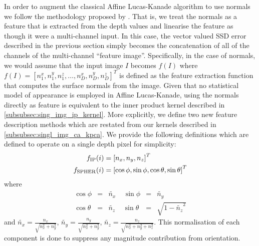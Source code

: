 In order to augment the classical Affine Lucas-Kanade algorithm to use normals
we follow the methodology proposed by \citet{antonakos2015feature}. That is,
we treat the normals as a feature that is extracted from the depth values
and linearise the feature as though it were a multi-channel input. In this case,
the vector valued SSD error described in the previous section simply
becomes the concatenation of all of the channels of the multi-channel
``feature image''. Specifically, in the case of normals, we would assume
that the input image $I$ becomes $f(I)$ where
$f(I) = {[n^x_1, n^y_1, n^z_1, \ldots, n^x_D, n^y_D, n^z_D]}^T$ is defined as
the feature extraction function that computes the surface normals from the
image. Given that no statistical model of appearance is employed in Affine
Lucas-Kanade, using the normals directly as feature is equivalent to
the inner product kernel described in \cref{subsubsec:sing_img_ip_kernel}.
More explicitly, we define two new feature description methods which are
restated from our kernels described in \cref{subsubsec:singl_img_ca_kpca}.
We provide the following definitions which are defined to operate on a single
depth pixel for simplicity:
\begin{equation}
    \begin{aligned}\label{eq:normal_feature_functions}
        f_{\operatorname{IP}}(i)    &= {[n_x, n_y, n_z]}^T \\
        f_{\operatorname{SPHER}}(i) &= {[\cos \phi, \sin \phi, \cos \theta, \sin \theta]}^T
    \end{aligned}
\end{equation}
where
\begin{equation}
    \begin{aligned}\label{eq:normalised-spherical}
        \cos \phi   &=& \tilde{n_x} \;\;\;\; \sin \phi   &=& \tilde{n_y} \\
        \cos \theta &=& \tilde{n_z} \;\;\;\; \sin \theta &=& \sqrt{1 - {\tilde{n_z}}^2}
    \end{aligned}
\end{equation}
and $\tilde{n_x} = \frac{n_x}{\sqrt{n_x^2 + n_y^2}}$,
$\tilde{n_y} = \frac{n_y}{\sqrt{n_x^2 + n_y^2}}$,
$\tilde{n_z} = \frac{n_z}{\sqrt{n_x^2 + n_y^2 + n_z^2}}$.
This normalisation of each component is done to suppress any magnitude
contribution from orientation.

